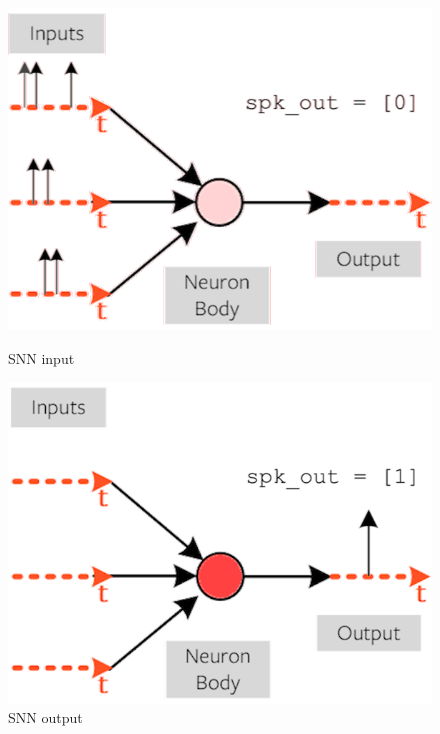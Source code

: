 \documentclass[11pt]{article}
\begin{document}
\begin{figure}[h]
  \centering
  \begin{minipage}{0.45\textwidth}
    \centering
    \includegraphics[width=1\textwidth]{image/def1.png}
    \caption{SNN input}
    \label{fig:def1}
  \end{minipage}\hfill
  \begin{minipage}{0.45\textwidth}
    \centering
    \includegraphics[width=1\textwidth]{image/def2.png}
    \caption{SNN output}
    \label{fig:def2}
  \end{minipage}
\end{figure}

\pagebreak
\end{document}
